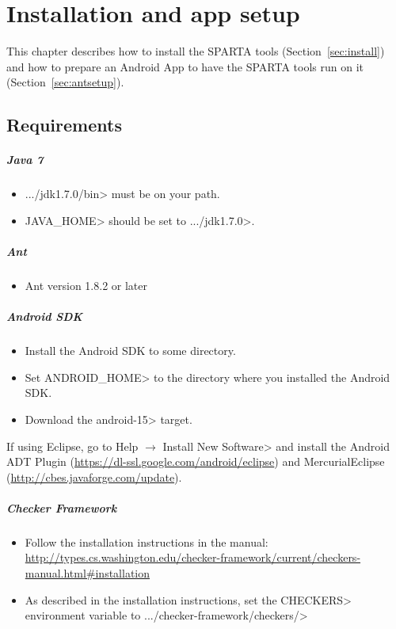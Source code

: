 \htmlhr
\chapter{Installation and app setup\label{installation}}

This chapter describes how to install the SPARTA tools
(Section~\ref{sec:install}) and how to prepare an Android App to have the
SPARTA tools run on it (Section~\ref{sec:antsetup}).

\section {Requirements\label{sec:requirements}}
\paragraph{Java 7}
\begin{itemize}
 \item  \<.../jdk1.7.0/bin> must be on your path.
 \item \<JAVA\_HOME> should be set to \<.../jdk1.7.0>.
\end{itemize}

\paragraph{Ant}
\begin{itemize}
 \item Ant version 1.8.2 or later
\end{itemize}

\paragraph{Android SDK}
\begin{itemize}
 \item Install the Android SDK to some directory. 
 \item Set \<ANDROID\_HOME> to the directory where you installed the
   Android SDK.
 \item Download the \<android-15> target.  
\end{itemize}

If using Eclipse, go to
\<Help $\rightarrow$ Install New Software>
and install the Android ADT Plugin (\url{https://dl-ssl.google.com/android/eclipse}) and MercurialEclipse (\url{http://cbes.javaforge.com/update}).

\paragraph{Checker Framework}
\begin{itemize}
\item Follow the installation instructions in the manual: 
\url{http://types.cs.washington.edu/checker-framework/current/checkers-manual.html#installation}
\item As described in the installation instructions, set the \<CHECKERS>
  environment variable to \<.../checker-framework/checkers/>
\end{itemize}


